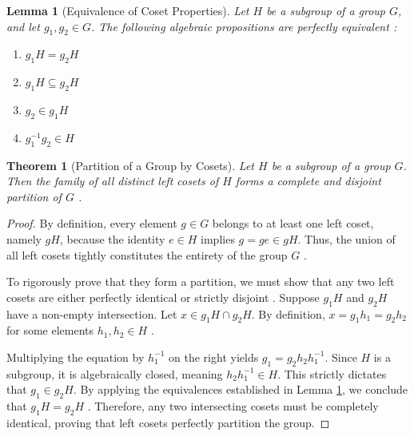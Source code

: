 \documentclass[11pt]{article}
\theoremstyle{definition}
\theoremstyle{plain}
\newtheorem{theorem}{Theorem}[section]
\newtheorem{lemma}{Lemma}[theorem]
\theoremstyle{remark}
\begin{document}
\begin{lemma}[Equivalence of Coset Properties] \label{lem:coset_equiv}
Let $H$ be a subgroup of a group $G$, and let $g_1, g_2 \in G$. The following algebraic propositions are perfectly equivalent \cite{dummit}:
\begin{enumerate}
    \item $g_1 H = g_2 H$
    \item $g_1 H \subseteq g_2 H$
    \item $g_2 \in g_1 H$
    \item $g_1^{-1} g_2 \in H$
\end{enumerate}
\end{lemma}

\begin{theorem}[Partition of a Group by Cosets]
Let $H$ be a subgroup of a group $G$. Then the family of all distinct left cosets of $H$ forms a complete and disjoint partition of $G$ \cite{fraleigh}.
\end{theorem}

\begin{proof}
By definition, every element $g \in G$ belongs to at least one left coset, namely $gH$, because the identity $e \in H$ implies $g = ge \in gH$. Thus, the union of all left cosets tightly constitutes the entirety of the group $G$ \cite{gallian}.

To rigorously prove that they form a partition, we must show that any two left cosets are either perfectly identical or strictly disjoint \cite{fraleigh}. Suppose $g_1 H$ and $g_2 H$ have a non-empty intersection. Let $x \in g_1 H \cap g_2 H$. By definition, $x = g_1 h_1 = g_2 h_2$ for some elements $h_1, h_2 \in H$ \cite{dummit}. 

Multiplying the equation by $h_1^{-1}$ on the right yields $g_1 = g_2 h_2 h_1^{-1}$. Since $H$ is a subgroup, it is algebraically closed, meaning $h_2 h_1^{-1} \in H$. This strictly dictates that $g_1 \in g_2 H$. By applying the equivalences established in Lemma \ref{lem:coset_equiv}, we conclude that $g_1 H = g_2 H$ \cite{gallian}. 
Therefore, any two intersecting cosets must be completely identical, proving that left cosets perfectly partition the group.
\end{proof}
\end{document}
